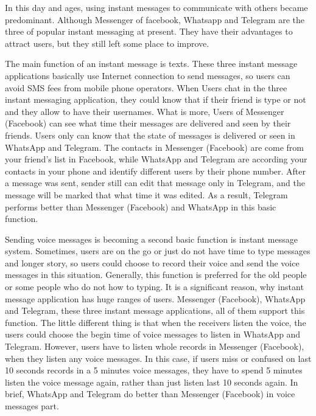 \documentclass[a4paper,11pt]{article}
\begin{document}
In this day and ages, using instant messages to communicate with others became predominant.
Although Messenger of facebook, Whatsapp and Telegram are the three of popular instant messaging at present.
They have their advantages to attract users, but they still left some place to improve.

The main function of an instant message is texts. These three instant message applications basically use Internet connection to send messages, so users can avoid SMS fees from mobile phone operators. When Users chat in the three instant messaging application, they could know that if their friend is type or not and they allow to have their usernames. What is more, Users of Messenger (Facebook) can see what time their messages are delivered and seen by their friends. Users only can know that the state of messages is delivered or seen in WhatsApp and Telegram. The contacts in Messenger (Facebook) are come from your friend's list in Facebook, while WhatsApp and Telegram are according your contacts in your phone and identify different users by their phone number. After a message was sent, sender still can edit that message only in Telegram, and the message will be marked that what time it was edited. As a result, Telegram performs better than Messenger (Facebook) and WhatsApp in this basic function.

Sending voice messages is becoming a second basic function is instant message system. Sometimes, users are on the go or just do not have time to type messages and longer story, so users could choose to record their voice and send the voice messages in this situation. Generally, this function is preferred for the old people or some people who do not how to typing. It is a significant reason, why instant message application has huge ranges of users. Messenger (Facebook), WhatsApp and Telegram, these three instant message applications, all of them support this function. The little different thing is that when the receivers listen the voice, the users could choose the begin time of voice messages to listen in WhatsApp and Telegram. However, users have to listen whole records in Messenger (Facebook), when they listen any voice messages. In this case, if users miss or confused on last 10 seconds records in a 5 minutes voice messages, they have to spend 5 minutes listen the voice message again, rather than just listen last 10 seconds again. In brief, WhatsApp and Telegram do better than Messenger (Facebook) in voice messages part.
\end{document}
